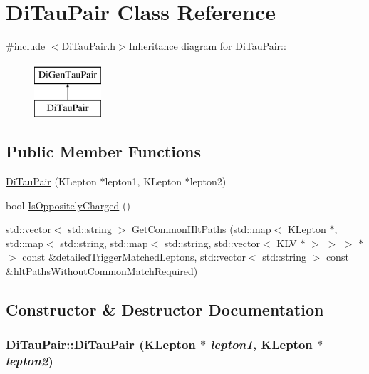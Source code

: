 \hypertarget{classDiTauPair}{
\section{DiTauPair Class Reference}
\label{classDiTauPair}
}


{\ttfamily \#include $<$DiTauPair.h$>$}Inheritance diagram for DiTauPair::\begin{figure}[H]
\begin{center}
\leavevmode
\includegraphics[height=2cm]{classDiTauPair}
\end{center}
\end{figure}
\subsection*{Public Member Functions}
\begin{DoxyCompactItemize}
\item 
\hyperlink{classDiTauPair_a9309ebbe69e3c31c55c68952d8c7d90b}{DiTauPair} (KLepton $\ast$lepton1, KLepton $\ast$lepton2)
\item 
bool \hyperlink{classDiTauPair_ae35cca423608713d97775bd0c0c7db95}{IsOppositelyCharged} ()
\item 
std::vector$<$ std::string $>$ \hyperlink{classDiTauPair_a327dd76a811005aefd533efbf3d49010}{GetCommonHltPaths} (std::map$<$ KLepton $\ast$, std::map$<$ std::string, std::map$<$ std::string, std::vector$<$ KLV $\ast$ $>$ $>$ $>$ $\ast$ $>$ const \&detailedTriggerMatchedLeptons, std::vector$<$ std::string $>$ const \&hltPathsWithoutCommonMatchRequired)
\end{DoxyCompactItemize}


\subsection{Constructor \& Destructor Documentation}
\hypertarget{classDiTauPair_a9309ebbe69e3c31c55c68952d8c7d90b}{
\subsubsection[{DiTauPair}]{\setlength{\rightskip}{0pt plus 5cm}DiTauPair::DiTauPair (KLepton $\ast$ {\em lepton1}, \/  KLepton $\ast$ {\em lepton2})}}
\label{classDiTauPair_a9309ebbe69e3c31c55c68952d8c7d90b}


